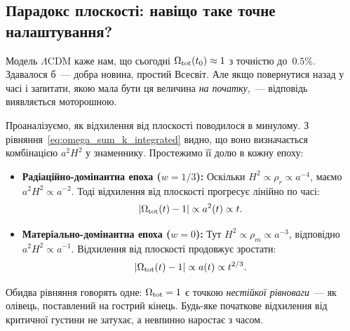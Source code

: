 \subsection{Парадокс плоскості: навіщо таке точне налаштування?}
\label{subsec:flatness_paradox}

Модель $\Lambda$CDM каже нам, що сьогодні $\Omega_{\rm tot}(t_0) \approx 1$ з точністю до~$0.5\%$.
Здавалося б~--- добра новина, простий Всесвіт.
Але якщо повернутися назад у часі і запитати, якою мала бути ця величина
\emph{на початку},~--- відповідь виявляється моторошною.

Проаналізуємо, як відхилення від плоскості поводилося в минулому.
З рівняння~\eqref{eq:omega_sum_k_integrated} видно, що воно визначається
комбінацією $a^2 H^2$ у знаменнику. Простежимо її долю в кожну епоху:
\begin{itemize}
  \item \textbf{Радіаційно-домінантна епоха ($w = 1/3$):} Оскільки $H^2 \propto \rho_r \propto a^{-4}$, маємо $a^2 H^2 \propto a^{-2}$. Тоді відхилення від плоскості прогресує лінійно по часі:
  \begin{equation}\label{eq:omega_evolution_r_new}
    |\Omega_{\rm tot}(t) - 1| \propto a^2(t) \propto t.
  \end{equation}
  \item \textbf{Матеріально-домінантна епоха ($w = 0$):} Тут $H^2 \propto \rho_m \propto a^{-3}$, відповідно $a^2 H^2 \propto a^{-1}$. Відхилення від плоскості продовжує зростати:
  \begin{equation}\label{eq:omega_evolution_m_new}
    |\Omega_{\rm tot}(t) - 1| \propto a(t) \propto t^{2/3}.
  \end{equation}
\end{itemize}

Обидва рівняння говорять одне: $\Omega_{\rm tot} = 1$ є точкою
\emph{нестійкої рівноваги}~--- як олівець, поставлений на гострий кінець.
Будь-яке початкове відхилення від критичної густини не затухає,
а невпинно наростає з часом.

